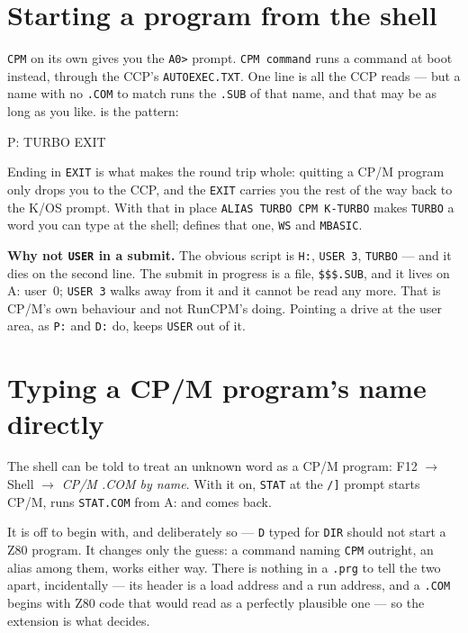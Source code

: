 \section{Starting a program from the shell}
\verb|CPM| on its own gives you the \verb|A0>| prompt. \verb|CPM command|
runs a command at boot instead, through the CCP's \texttt{AUTOEXEC.TXT}.
One line is all the CCP reads --- but a name with no \texttt{.COM} to
match runs the \texttt{.SUB} of that name, and that may be as long as you
like.  is the pattern:

\begin{type}
P:
TURBO
EXIT
\end{type}

Ending in \verb|EXIT| is what makes the round trip whole: quitting a CP/M
program only drops you to the CCP, and the \verb|EXIT| carries you the
rest of the way back to the K/OS prompt. With that in place
\verb|ALIAS TURBO CPM K-TURBO| makes \verb|TURBO| a word you can type at
the shell;  defines that one, \verb|WS|
and \verb|MBASIC|.

\begin{aside}
\textbf{Why not \texttt{USER} in a submit.} The obvious script is
\verb|H:|, \verb|USER 3|, \verb|TURBO| --- and it dies on the second line.
The submit in progress is a file, \texttt{\$\$\$.SUB}, and it lives on
A: user~0; \verb|USER 3| walks away from it and it cannot be read any
more. That is CP/M's own behaviour and not RunCPM's doing. Pointing a
drive at the user area, as \verb|P:| and \verb|D:| do, keeps \verb|USER|
out of it.
\end{aside}

\section{Typing a CP/M program's name directly}
The shell can be told to treat an unknown word as a CP/M program: F12
\(\rightarrow\) Shell \(\rightarrow\) \emph{CP/M .COM by name}. With it on,
\verb|STAT| at the \verb|/]| prompt starts CP/M, runs \texttt{STAT.COM}
from A: and comes back.

It is off to begin with, and deliberately so --- \verb|D| typed for
\verb|DIR| should not start a Z80 program. It changes only the guess: a
command naming \verb|CPM| outright, an alias among them, works either way.
There is nothing in a \texttt{.prg} to tell the two apart, incidentally ---
its header is a load address and a run address, and a \texttt{.COM} begins
with Z80 code that would read as a perfectly plausible one --- so the
extension is what decides.

